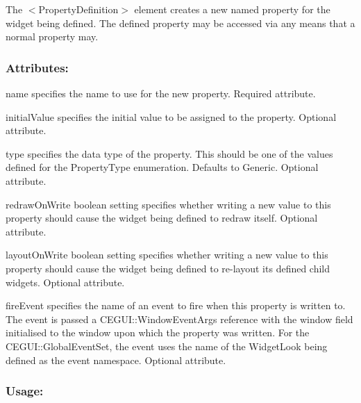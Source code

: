 The {\ttfamily $<$Property\+Definition$>$} element creates a new named property for the widget being defined. The defined property may be accessed via any means that a \textquotesingle{}normal\textquotesingle{} property may.\hypertarget{fal_element_ref_fal_elem_ref_sec_26_2}{}\subsubsection{Attributes\+:}\label{fal_element_ref_fal_elem_ref_sec_26_2}
\begin{DoxyItemize}
\item {\ttfamily name} specifies the name to use for the new property. Required attribute. \item {\ttfamily initial\+Value} specifies the initial value to be assigned to the property. Optional attribute. \item {\ttfamily type} specifies the data type of the property. This should be one of the values defined for the Property\+Type enumeration. Defaults to {\ttfamily Generic}. Optional attribute. \item {\ttfamily redraw\+On\+Write} boolean setting specifies whether writing a new value to this property should cause the widget being defined to redraw itself. Optional attribute. \item {\ttfamily layout\+On\+Write} boolean setting specifies whether writing a new value to this property should cause the widget being defined to re-\/layout it\textquotesingle{}s defined child widgets. Optional attribute. \item {\ttfamily fire\+Event} specifies the name of an event to fire when this property is written to. The event is passed a C\+E\+G\+U\+I\+::\+Window\+Event\+Args reference with the window field initialised to the window upon which the property was written. For the C\+E\+G\+U\+I\+::\+Global\+Event\+Set, the event uses the name of the Widget\+Look being defined as the event namespace. Optional attribute.\end{DoxyItemize}
\hypertarget{fal_element_ref_fal_elem_ref_sec_26_3}{}\subsubsection{Usage\+:}\label{fal_element_ref_fal_elem_ref_sec_26_3}

